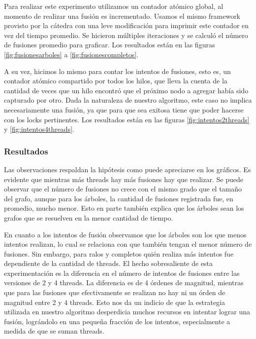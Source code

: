 Para realizar este experimento utilizamos un contador atómico global, al 
momento de realizar una fusión es incrementado. Usamos el mismo framework 
provisto por la cátedra con una leve modificación para imprimir este contador 
en vez del tiempo promedio. Se hicieron múltiples iteraciones y se 
calculó el número de fusiones promedio para graficar. Los resultados están en 
las figuras \ref{fig:fusionesarboles} a \ref{fig:fusionescompletos}.

A su vez, hicimos lo mismo para contar los intentos de fusiones, esto es, 
un contador atómico compartido por todos los hilos, que lleva la cuenta de 
la cantidad de veces que un hilo encontró que el próximo nodo a agregar había 
sido capturado por otro. Dada la naturaleza de nuestro algoritmo, este caso no 
implica necesariamente una fusión, ya que para que sea exitosa tiene que poder 
hacerse con los locks pertinentes. Los resultados están en 
las figuras \ref{fig:intentos2threads} y \ref{fig:intentos4threads}.

\subsubsection{Resultados}

Las observaciones respaldan la hipótesis como puede apreciarse en los gráficos.
 Es evidente que mientras más threads hay más fusiones hay que realizar. Se 
puede observar que el número de fusiones no crece con el mismo grado que el tamaño 
del grafo, aunque para los árboles, la cantidad de fusiones registrada fue, 
en promedio, mucho menor. Esto en parte también explica que los árboles sean 
los grafos que se resuelven en la menor cantidad de tiempo.

En cuanto a los intentos de fusión observamos que los árboles son los que menos 
intentos realizan, lo cual se relaciona con que también tengan el menor número 
de fusiones. Sin embargo, para ralos y completos quién realiza más intentos 
fue dependiente de la cantidad de threads. El hecho sobresaliente de esta 
experimentación es la diferencia en el número de intentos de fusiones entre 
las versiones de 2 y 4 threads. La diferencia es de 4 órdenes de magnitud, 
mientras que para las fusiones que efectivamente se realizan no hay ni un 
órden de magnitud entre 2 y 4 threads. Esto nos da un indicio de que la estrategia
 utilizada en nuestro algoritmo desperdicia muchos recursos en intentar lograr 
una fusión, lográndolo en una pequeña fracción de los intentos, especialmente 
a medida de que se suman threads.

